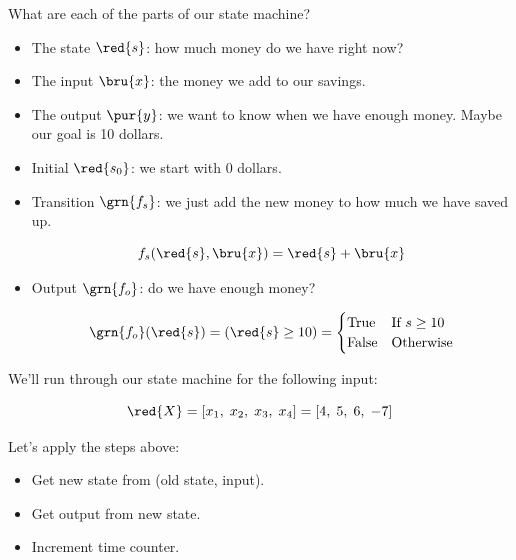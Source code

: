         What are each of the parts of our state machine?
        
        \begin{itemize}
            \item The state $\red{s}$: how much money do we have right now?
            
            \item The input $\bru{x}$: the money we add to our savings.
            
            \item The output $\pur{y}$: we want to know when we have enough money. Maybe our goal is 10 dollars.
            
            \item Initial $\red{s_0}$: we start with 0 dollars.
            
            \item Transition $\grn{f_s}$: we just add the new money to how much we have saved up.
            
                \begin{equation}
                    f_s(\red{s},\bru{x}) = \red{s}+\bru{x}
                \end{equation}
                
            \item Output $\grn{f_o}$: do we have enough money?
            
                \begin{equation}
                    \grn{f_o}(\red{s}) = (\red{s} \geq 10)
                    =
                    \begin{cases}
                        \text{True} & \text{If } s \geq 10 \\
                        \text{False} & \text{Otherwise}
                    \end{cases}
                \end{equation}
        \end{itemize}
        
        We'll run through our state machine for the following input:
        
        \begin{equation}
            \red{X} = [x_1, \; x_2, \; x_3, \; x_4] = [ 4, \; 5, \; 6, \; -7]
        \end{equation}
        
        Let's apply the steps above:
        
        \begin{itemize}
            \item Get new state from (old state, input).
            \item Get output from new state.
            \item Increment time counter.
        \end{itemize}
        
